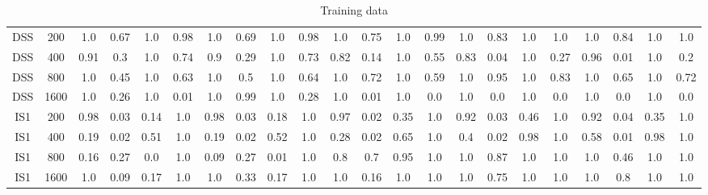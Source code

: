 \documentclass[10pt]{article}
\begin{document}
\begin{table}
\begin{tabular}{ cc||c c c c | c c c c | c c c c | c c c c| c c c c}
 					DSS & 200 & 1.0 & 0.67 & 1.0 & 0.98 & 1.0 & 0.69 & 1.0 & 0.98& 1.0 & 0.75 & 1.0 & 0.99& 1.0 & 0.83 & 1.0 & 1.0 & 1.0 & 0.84 & 1.0 & 1.0 \\ 
 					DSS & 400 & 0.91 & 0.3 & 1.0 & 0.74 & 0.9 & 0.29 & 1.0 & 0.73& 0.82 & 0.14 & 1.0 & 0.55& 0.83 & 0.04 & 1.0 & 0.27 & 0.96 & 0.01 & 1.0 & 0.2\\ 
 					DSS & 800 & 1.0 & 0.45 & 1.0 & 0.63 & 1.0 & 0.5 & 1.0 & 0.64& 1.0 & 0.72 & 1.0 & 0.59& 1.0 & 0.95 & 1.0 & 0.83 & 1.0 & 0.65 & 1.0 & 0.72\\ 
 					DSS & 1600 & 1.0 & 0.26 & 1.0 & 0.01 & 1.0 & 0.99 & 1.0 & 0.28& 1.0 & 0.01 & 1.0 & 0.0& 1.0 & 0.0 & 1.0 & 0.0 & 1.0 & 0.0 & 1.0 & 0.0\\ \hline
 					IS1 & 200 & 0.98 & 0.03 & 0.14 & 1.0 & 0.98 & 0.03 & 0.18 & 1.0& 0.97 & 0.02 & 0.35 & 1.0& 0.92 & 0.03 & 0.46 & 1.0 & 0.92 & 0.04 & 0.35 & 1.0\\ 
 					IS1 & 400 & 0.19 & 0.02 & 0.51 & 1.0 & 0.19 & 0.02 & 0.52 & 1.0& 0.28 & 0.02 & 0.65 & 1.0& 0.4 & 0.02 & 0.98 & 1.0 & 0.58 & 0.01 & 0.98 & 1.0\\ 
 					IS1 & 800 & 0.16 & 0.27 & 0.0 & 1.0 & 0.09 & 0.27 & 0.01 & 1.0& 0.8 & 0.7 & 0.95 & 1.0& 1.0 & 0.87 & 1.0 & 1.0 & 1.0 & 0.46 & 1.0 & 1.0\\ 
 					IS1 & 1600 & 1.0 & 0.09 & 0.17 & 1.0 & 1.0 & 0.33 & 0.17 & 1.0& 1.0 & 0.16 & 1.0 & 1.0& 1.0 & 0.75 & 1.0 & 1.0 & 1.0 & 0.8 & 1.0 & 1.0\\ \hline
 \hline
  \end{tabular}
  \caption{Training data}
\end{table}
\end{document}
